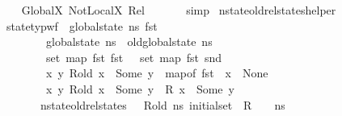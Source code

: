\begin{isabellebody}
\ \ \ \ \isamarkupfalse%
\ GlobalX\ NotLocalX\ Rel\ \isanewline
\ \ \ \ \isamarkupfalse%
\ simp\isanewline
{}\isamarkupfalse%
%
\endisatagproof
{\isafoldproof}%
%
\isadelimproof
\isanewline
%
\endisadelimproof
\isanewline
{}\isamarkupfalse%
\ nstate{\isacharunderscore}{\kern0pt}old{\isacharunderscore}{\kern0pt}rel{\isacharunderscore}{\kern0pt}states{\isacharunderscore}{\kern0pt}helper{\isacharcolon}{\kern0pt}\isanewline
\ \ \ {\isachardoublequoteopen}state{\isacharunderscore}{\kern0pt}typ{\isacharunderscore}{\kern0pt}wf\ {\isacharbrackleft}{\kern0pt}{\isacharbrackright}{\kern0pt}\ {\isacharparenleft}{\kern0pt}global{\isacharunderscore}{\kern0pt}state\ ns{\isacharparenright}{\kern0pt}\ {\isacharparenleft}{\kern0pt}fst\ {\isasymLambda}{}{\isacharparenright}{\kern0pt}{\isachardoublequoteclose}\ \isanewline
\ \ \ \ \ \ \ \ \ \ {\isachardoublequoteopen}global{\isacharunderscore}{\kern0pt}state\ ns\ {\isacharequal}{\kern0pt}\ old{\isacharunderscore}{\kern0pt}global{\isacharunderscore}{\kern0pt}state\ ns{\isachardoublequoteclose}\ \isanewline
\ \ \ \ \ \ \ \ \ \ {\isachardoublequoteopen}set\ {\isacharparenleft}{\kern0pt}map\ fst\ {\isacharparenleft}{\kern0pt}fst\ {\isasymLambda}{}{\isacharparenright}{\kern0pt}{\isacharparenright}{\kern0pt}\ {\isasyminter}\ set\ {\isacharparenleft}{\kern0pt}map\ fst\ {\isacharparenleft}{\kern0pt}snd\ {\isasymLambda}{}{\isacharparenright}{\kern0pt}{\isacharparenright}{\kern0pt}\ {\isacharequal}{\kern0pt}\ {\isacharbraceleft}{\kern0pt}{\isacharbraceright}{\kern0pt}{\isachardoublequoteclose}\isanewline
\ \ \ \ \ \ \ \ \ \ {\isachardoublequoteopen}{\isasymAnd}x\ y{\isachardot}{\kern0pt}\ R{\isacharunderscore}{\kern0pt}old\ x\ {\isacharequal}{\kern0pt}\ Some\ y\ {\isasymlongrightarrow}\ map{\isacharunderscore}{\kern0pt}of\ {\isacharparenleft}{\kern0pt}fst\ {\isasymLambda}{}{\isacharparenright}{\kern0pt}\ x\ {\isasymnoteq}\ None{\isachardoublequoteclose}\ \isanewline
\ \ \ \ \ \ \ \ \ \ {\isachardoublequoteopen}{\isasymAnd}x\ y{\isachardot}{\kern0pt}\ R{\isacharunderscore}{\kern0pt}old\ x\ {\isacharequal}{\kern0pt}\ Some\ y\ {\isasymlongrightarrow}\ R\ x\ {\isacharequal}{\kern0pt}\ Some\ y{\isachardoublequoteclose}\isanewline
\ \ \ \ \ \ \ \ \ {\isachardoublequoteopen}nstate{\isacharunderscore}{\kern0pt}old{\isacharunderscore}{\kern0pt}rel{\isacharunderscore}{\kern0pt}states\ {\isasymLambda}{}\ {\isasymLambda}{}\ R{\isacharunderscore}{\kern0pt}old\ ns\ {\isacharparenleft}{\kern0pt}initial{\isacharunderscore}{\kern0pt}set\ \ R\ {\isasymLambda}{}\ {\isasymLambda}{}\ {\isacharbrackleft}{\kern0pt}{\isacharbrackright}{\kern0pt}\ ns{\isacharparenright}{\kern0pt}{\isachardoublequoteclose}\isanewline

\end{isabellebody}
